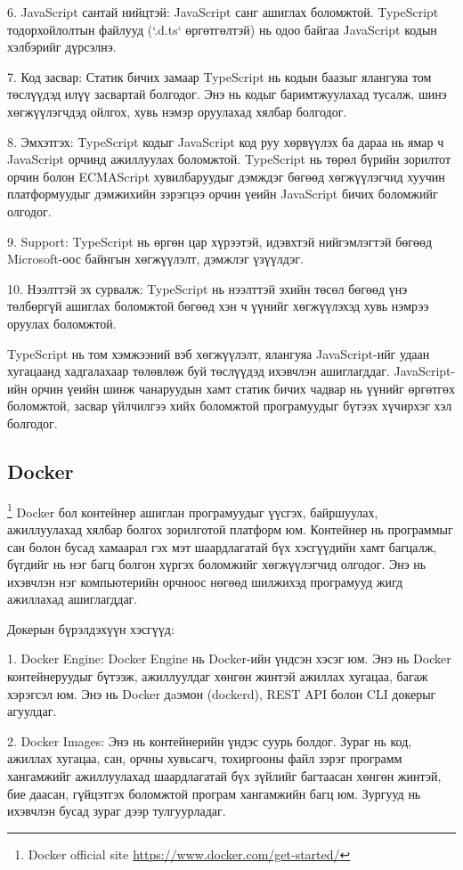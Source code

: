 			6. JavaScript сантай нийцтэй: JavaScript санг ашиглах боломжтой. TypeScript тодорхойлолтын файлууд (`.d.ts` өргөтгөлтэй) нь одоо байгаа JavaScript кодын хэлбэрийг дүрсэлнэ.
			
			7. Код засвар: Статик бичих замаар TypeScript нь кодын баазыг ялангуяа том төслүүдэд илүү засвартай болгодог. Энэ нь кодыг баримтжуулахад тусалж, шинэ хөгжүүлэгчдэд ойлгох, хувь нэмэр оруулахад хялбар болгодог.
			
			8. Эмхэтгэх: TypeScript кодыг JavaScript код руу хөрвүүлэх ба дараа нь ямар ч JavaScript орчинд ажиллуулах боломжтой. TypeScript нь төрөл бүрийн зорилтот орчин болон ECMAScript хувилбаруудыг дэмждэг бөгөөд хөгжүүлэгчид хуучин платформуудыг дэмжихийн зэрэгцээ орчин үеийн JavaScript бичих боломжийг олгодог.
			
			9. Support: TypeScript нь өргөн цар хүрээтэй, идэвхтэй нийгэмлэгтэй бөгөөд Microsoft-оос байнгын хөгжүүлэлт, дэмжлэг үзүүлдэг.
			
			10. Нээлттэй эх сурвалж: TypeScript нь нээлттэй эхийн төсөл бөгөөд үнэ төлбөргүй ашиглах боломжтой бөгөөд хэн ч үүнийг хөгжүүлэхэд хувь нэмрээ оруулах боломжтой.
			
			TypeScript нь том хэмжээний вэб хөгжүүлэлт, ялангуяа JavaScript-ийг удаан хугацаанд хадгалахаар төлөвлөж буй төслүүдэд ихэвчлэн ашиглагддаг. JavaScript-ийн орчин үеийн шинж чанаруудын хамт статик бичих чадвар нь үүнийг өргөтгөх боломжтой, засвар үйлчилгээ хийх боломжтой програмуудыг бүтээх хүчирхэг хэл болгодог. 
	\pagebreak
\subsection{Docker}
		\footnote{Docker official site \url{https://www.docker.com/get-started/}}
			\quad \quad Docker бол контейнер ашиглан програмуудыг үүсгэх, байршуулах, ажиллуулахад хялбар болгох зорилготой платформ юм. Контейнер нь программыг сан болон бусад хамаарал гэх мэт шаардлагатай бүх хэсгүүдийн хамт багцалж, бүгдийг нь нэг багц болгон хүргэх боломжийг хөгжүүлэгчид олгодог. Энэ нь ихэвчлэн нэг компьютерийн орчноос нөгөөд шилжихэд програмууд жигд ажиллахад ашиглагддаг.

			Докерын бүрэлдэхүүн хэсгүүд:
			
			1. Docker Engine: Docker Engine нь Docker-ийн үндсэн хэсэг юм. Энэ нь Docker контейнеруудыг бүтээж, ажиллуулдаг хөнгөн жинтэй ажиллах хугацаа, багаж хэрэгсэл юм. Энэ нь Docker дaэмон (dockerd), REST API болон CLI докерыг агуулдаг.
			
			2. Docker Images: Энэ нь контейнерийн үндэс суурь болдог. Зураг нь код, ажиллах хугацаа, сан, орчны хувьсагч, тохиргооны файл зэрэг программ хангамжийг ажиллуулахад шаардлагатай бүх зүйлийг багтаасан хөнгөн жинтэй, бие даасан, гүйцэтгэх боломжтой програм хангамжийн багц юм. Зургууд нь ихэвчлэн бусад зураг дээр тулгуурладаг.
			
